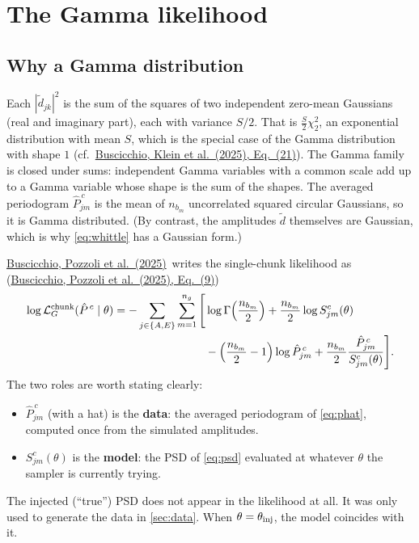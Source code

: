 \documentclass[11pt,a4paper]{article}
\newcommand{\urlPone}{https://arxiv.org/pdf/2511.03604}
\newcommand{\urlPtwo}{https://arxiv.org/pdf/2410.08263}
\newcommand{\Pone}{\href{\urlPone}{Buscicchio, Pozzoli et al.~(2025)}}
\newcommand{\PoneEq}[1]{\href{\urlPone}{Buscicchio, Pozzoli et al.~(2025), Eq.~(#1)}}
\newcommand{\PtwoEq}[1]{\href{\urlPtwo}{Buscicchio, Klein et al.~(2025), Eq.~(#1)}}
\newcommand{\Pbar}{\hat{P}}
\begin{document}
\section{The Gamma likelihood}\label{sec:gamma}

\subsection{Why a Gamma distribution}

Each $|\tilde d_{jk}|^2$ is the sum of the squares of two independent zero-mean
Gaussians (real and imaginary part), each with variance $S/2$. That is
$\tfrac{S}{2}\chi^2_2$, an exponential distribution with mean $S$, which is the
special case of the Gamma distribution with shape $1$
(cf.\ \PtwoEq{21}). The Gamma family is closed under sums: independent Gamma
variables with a common scale add up to a Gamma variable whose shape is the sum of
the shapes. The averaged periodogram $\Pbar^{\,c}_{jm}$ is the mean of $n_{b_m}$
uncorrelated squared circular Gaussians, so it is Gamma distributed. (By contrast,
the amplitudes $\tilde d$ themselves are Gaussian, which is why
\cref{eq:whittle} has a Gaussian form.)

\Pone\ writes the single-chunk likelihood as (\PoneEq{9})
\begin{equation}
  \begin{split}
  \log\mathcal{L}^{\rm chunk}_G(\Pbar^{\,c}\mid\theta) =
  -\sum_{j\in\{A,E\}}\sum_{m=1}^{n_g}\Bigg[ &
  \log\Gamma\!\left(\frac{n_{b_m}}{2}\right)
  + \frac{n_{b_m}}{2}\log S^c_{jm}(\theta) \\
  &- \left(\frac{n_{b_m}}{2}-1\right)\log\Pbar^{\,c}_{jm}
  + \frac{n_{b_m}}{2}\frac{\Pbar^{\,c}_{jm}}{S^c_{jm}(\theta)}
  \Bigg].
  \end{split}
  \label{eq:gamma}
\end{equation}
The two roles are worth stating clearly:
\begin{itemize}
  \item $\Pbar^{\,c}_{jm}$ (with a hat) is the \textbf{data}: the averaged periodogram
        of \cref{eq:phat}, computed once from the simulated amplitudes.
  \item $S^c_{jm}(\theta)$ is the \textbf{model}: the PSD of \cref{eq:psd} evaluated
        at whatever $\theta$ the sampler is currently trying.
\end{itemize}
The injected (``true'') PSD does not appear in the likelihood at all. It was only
used to generate the data in \cref{sec:data}. When $\theta=\theta_{\rm inj}$, the
model coincides with it.
\end{document}
